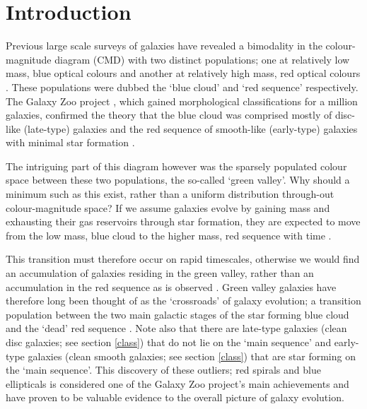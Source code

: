 \documentclass{mn2e}
\begin{document}
\section{Introduction}
Previous large scale surveys of galaxies have revealed a bimodality in the colour-magnitude diagram (CMD) with two distinct populations; one at relatively low mass, blue optical colours and another at relatively high mass, red optical colours \citep{Baldry04, Baldry06, Willmer06, Brammer09}. These populations were dubbed the `blue cloud' and `red sequence' respectively. The Galaxy Zoo project \citep{Lintott09, Lintott11}, which gained morphological classifications for a million galaxies, confirmed the theory that the blue cloud was comprised mostly of disc-like (late-type) galaxies and the red sequence of smooth-like (early-type) galaxies with minimal star formation \citep{Bamford09, Skibba09}. 

The intriguing part of this diagram however was the sparsely populated colour space between these two populations, the so-called `green valley'. Why should a minimum such as this exist, rather than a uniform distribution through-out colour-magnitude space? If we assume galaxies evolve by gaining mass and exhausting their gas reservoirs through star formation, they are expected to move from the low mass, blue cloud to the higher mass, red sequence with time \citep{Salim07}. 

This transition must therefore occur on rapid timescales, otherwise we would find an accumulation of galaxies residing in the green valley, rather than an accumulation in the red sequence as is observed \citep{Arnouts07, Martin07}. Green valley galaxies have therefore long been thought of as the `crossroads' of galaxy evolution; a transition population between the two main galactic stages of the star forming blue cloud and the `dead' red sequence \citep{Bell04, Wyder07, Schim07, Martin07, Faber07, Mendez11, Gonc12, Sch2014}. Note also that there are late-type galaxies (clean disc galaxies; see section \ref{class}) that do not lie on the `main sequence' and early-type galaxies (clean smooth galaxies; see section \ref{class}) that are star forming on the `main sequence'. This discovery of these outliers; red spirals \citep{Masters10} and blue ellipticals \citep{Sch09} is considered one of the Galaxy Zoo project's main achievements and have proven to be valuable evidence to the overall picture of galaxy evolution. 
\end{document}
